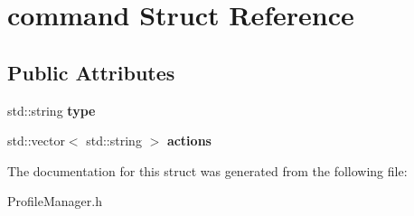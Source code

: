 \hypertarget{structcommand}{\section{command Struct Reference}
\label{structcommand}
}
\subsection*{Public Attributes}
\begin{DoxyCompactItemize}
\item 
\hypertarget{structcommand_a91989a77c13f08ecf82fa0a74588b707}{std\+::string {\bfseries type}}\label{structcommand_a91989a77c13f08ecf82fa0a74588b707}

\item 
\hypertarget{structcommand_a50cff0003f468bbdf7428f771e081239}{std\+::vector$<$ std\+::string $>$ {\bfseries actions}}\label{structcommand_a50cff0003f468bbdf7428f771e081239}

\end{DoxyCompactItemize}


The documentation for this struct was generated from the following file\+:\begin{DoxyCompactItemize}
\item 
Profile\+Manager.\+h\end{DoxyCompactItemize}
